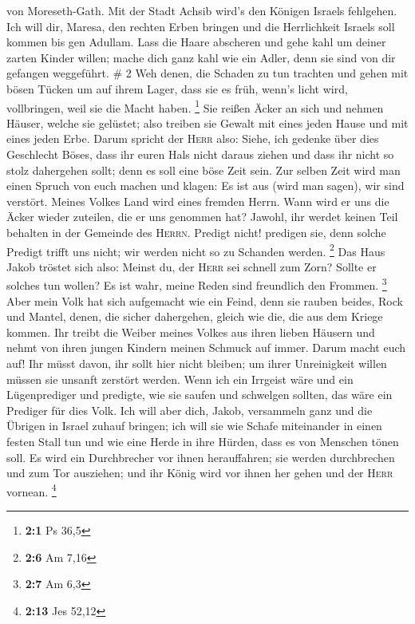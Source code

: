 von Moreseth-Gath. Mit der Stadt Achsib wird's den Königen Israels
fehlgehen.  Ich will dir, Maresa, den rechten Erben
bringen und die Herrlichkeit Israels soll kommen bis gen Adullam.
 Lass die Haare abscheren und gehe kahl um deiner zarten
Kinder willen; mache dich ganz kahl wie ein Adler, denn sie sind von dir
gefangen weggeführt. \# 2  Weh denen, die Schaden zu tun
trachten und gehen mit bösen Tücken um auf ihrem Lager, dass sie es
früh, wenn's licht wird, vollbringen, weil sie die Macht haben.
\footnote{\textbf{2:1} Ps 36,5}  Sie reißen Äcker an sich
und nehmen Häuser, welche sie gelüstet; also treiben sie Gewalt mit
eines jeden Hause und mit eines jeden Erbe.  Darum spricht
der \textsc{Herr} also: Siehe, ich gedenke über dies Geschlecht Böses,
dass ihr euren Hals nicht daraus ziehen und dass ihr nicht so stolz
dahergehen sollt; denn es soll eine böse Zeit sein.  Zur
selben Zeit wird man einen Spruch von euch machen und klagen: Es ist aus
(wird man sagen), wir sind verstört. Meines Volkes Land wird eines
fremden Herrn. Wann wird er uns die Äcker wieder zuteilen, die er uns
genommen hat?  Jawohl, ihr werdet keinen Teil behalten in
der Gemeinde des \textsc{Herrn}.  Predigt nicht! predigen
sie, denn solche Predigt trifft uns nicht; wir werden nicht so zu
Schanden werden. \footnote{\textbf{2:6} Am 7,16}  Das Haus
Jakob tröstet sich also: Meinst du, der \textsc{Herr} sei schnell zum
Zorn? Sollte er solches tun wollen? Es ist wahr, meine Reden sind
freundlich den Frommen. \footnote{\textbf{2:7} Am 6,3} 
Aber mein Volk hat sich aufgemacht wie ein Feind, denn sie rauben
beides, Rock und Mantel, denen, die sicher dahergehen, gleich wie die,
die aus dem Kriege kommen.  Ihr treibt die Weiber meines
Volkes aus ihren lieben Häusern und nehmt von ihren jungen Kindern
meinen Schmuck auf immer.  Darum macht euch auf! Ihr
müsst davon, ihr sollt hier nicht bleiben; um ihrer Unreinigkeit willen
müssen sie unsanft zerstört werden.  Wenn ich ein
Irrgeist wäre und ein Lügenprediger und predigte, wie sie saufen und
schwelgen sollten, das wäre ein Prediger für dies Volk. 
Ich will aber dich, Jakob, versammeln ganz und die Übrigen in Israel
zuhauf bringen; ich will sie wie Schafe miteinander in einen festen
Stall tun und wie eine Herde in ihre Hürden, dass es von Menschen tönen
soll.  Es wird ein Durchbrecher vor ihnen herauffahren;
sie werden durchbrechen und zum Tor ausziehen; und ihr König wird vor
ihnen her gehen und der \textsc{Herr} vornean. \footnote{\textbf{2:13}
  Jes 52,12}

